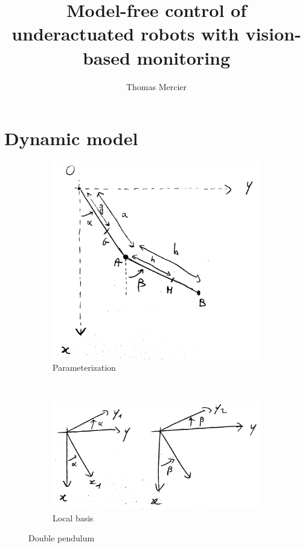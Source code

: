 \documentclass[a4paper,10pt]{article}
\title{Model-free control of underactuated robots with vision-based monitoring}
\author{Thomas Mercier}
\begin{document}
\maketitle

\begin{abstract}

\end{abstract}

\section{Dynamic model}

\begin{figure}
    \centering
    \begin{subfigure}[b]{0.45\textwidth}
        \includegraphics[scale=0.05]{fig/dynamics-double-pendulum.png}
        \caption{Parameterization}
        \label{fig:double-pendulum-param}
    \end{subfigure}
    ~
    \begin{subfigure}[b]{0.45\textwidth}
        \includegraphics[scale=0.05]{fig/dynamics-angles.png}
        \caption{Local basis}
        \label{fig:double-pendulum-basis}
    \end{subfigure}
    \caption{Double pendulum}\label{fig:double-pendulum}
\end{figure}
\end{document}
